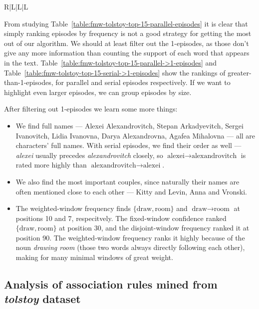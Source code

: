 \begin{table}
\begin{tabulary}{\textwidth}{R|L|L|L}
\end{tabulary}

\caption{The top 15 serial episodes found by our algorithm, excluding 1-episodes, with $ \rho = 15 $, and for the three frequency measures.}
\label{table:fmw-tolstoy-top-15-serial->1-episodes}
\end{table}

From studying Table~\ref{table:fmw-tolstoy-top-15-parallel-episodes} it is clear that simply ranking episodes by frequency is not a good strategy for getting the most out of our algorithm. We should at least filter out the 1-episodes, as those don't give any more information than counting the support of each word that appears in the text. Table~\ref{table:fmw-tolstoy-top-15-parallel->1-episodes} and Table~\ref{table:fmw-tolstoy-top-15-serial->1-episodes} show the rankings of greater-than-1-episodes, for parallel and serial episodes respectively. If we want to highlight even larger episodes, we can group episodes by size.

After filtering out 1-episodes we learn some more things:
\begin{itemize}
\item We find full names --- Alexei Alexandrovitch, Stepan Arkadyevitch, Sergei Ivanovitch, Lidia Ivanovna, Darya Alexandrovna, Agafea Mihalovna --- all are characters' full names. With serial episodes, we find their order as well --- \emph{alexei} usually precedes \emph{alexandrovitch} closely, so $ \text{alexei} \to \text{alexandrovitch} $ is rated more highly than $ \text{alexandrovitch} \to \text{alexei} $.
\item We also find the most important couples, since naturally their names are often mentioned close to each other --- Kitty and Levin, Anna and Vronski.
\item The weighted-window frequency finds $ \{ \text{draw}, \text{room} \} $ and $ \text{draw} \to \text{room} $ at positions 10 and 7, respecitvely. The fixed-window confidence ranked $ \{ \text{draw}, \text{room} \} $ at position 30, and the disjoint-window frequency ranked it at position 90. The weighted-window frequency ranks it highly because of the noun \emph{drawing room} (those two words always directly following each other), making for many minimal windows of great weight.
\end{itemize}

\subsection{Analysis of association rules mined from \emph{tolstoy} dataset}

